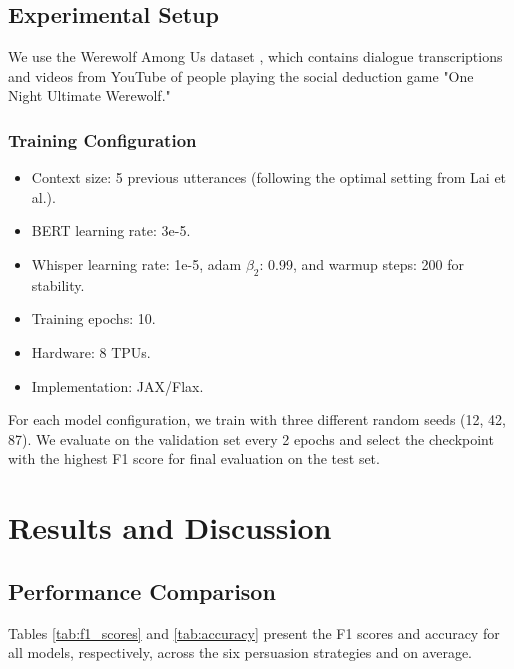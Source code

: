 \documentclass{article}
\begin{document}
\subsection{Experimental Setup}
We use the Werewolf Among Us dataset \cite{lai2022werewolf}, which contains dialogue transcriptions and videos from YouTube of people playing the social deduction game "One Night Ultimate Werewolf." 

\subsubsection{Training Configuration}
\begin{itemize}
    \item Context size: 5 previous utterances (following the optimal setting from Lai et al.).
    \item BERT learning rate: 3e-5.
    \item Whisper learning rate: 1e-5, adam $\beta_2$: 0.99, and warmup steps: 200 for stability.
    \item Training epochs: 10.
    \item Hardware: 8 TPUs.
    \item Implementation: JAX/Flax.
\end{itemize}

For each model configuration, we train with three different random seeds (12, 42, 87). We evaluate on the validation set every 2 epochs and select the checkpoint with the highest F1 score for final evaluation on the test set.

\section{Results and Discussion}

\subsection{Performance Comparison}
Tables \ref{tab:f1_scores} and \ref{tab:accuracy} present the F1 scores and accuracy for all models, respectively, across the six persuasion strategies and on average.
\end{document}
